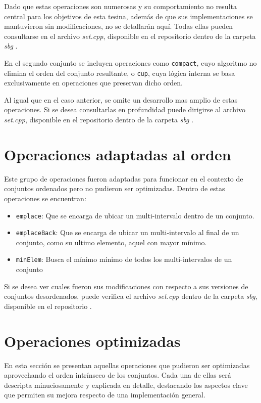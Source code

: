 Dado que estas operaciones son numerosas y su comportamiento no resulta central para los objetivos de esta tesina, además de que sus implementaciones se mantuvieron sin modificaciones, no se detallarán aquí. Todas ellas pueden consultarse en el archivo \textit{set.cpp}, disponible en el repositorio dentro de la carpeta \textit{sbg} \cite{sbg}.

En el segundo conjunto se incluyen operaciones como \texttt{compact}, cuyo algoritmo no elimina el orden del conjunto resultante, o \texttt{cup}, cuya lógica interna se basa exclusivamente en operaciones que preservan dicho orden.

Al igual que en el caso anterior, se omite un desarrollo mas amplio de estas operaciones. Si se desea consultarlas en profundidad puede dirigirse al archivo \textit{set.cpp}, disponible en el repositorio dentro de la carpeta \textit{sbg} \cite{sbg}.

\section{Operaciones adaptadas al orden}

Este grupo de operaciones fueron adaptadas para funcionar en el contexto de conjuntos ordenados pero no pudieron ser optimizadas. Dentro de estas operaciones se encuentran:

\begin{itemize}
    \item \texttt{emplace}: Que se encarga de ubicar un multi-intervalo dentro de un conjunto.
    \item \texttt{emplaceBack}: Que se encarga de ubicar un multi-intervalo al final de un conjunto, como su ultimo elemento, aquel con mayor mínimo.
    \item \texttt{minElem}: Busca el mínimo mínimo de todos los multi-intervalos de un conjunto
\end{itemize}

Si se desea ver cuales fueron sus modificaciones con respecto a sus versiones de conjuntos desordenados, puede verifica el archivo \textit{set.cpp} dentro de la carpeta \textit{sbg}, disponible en el repositorio \cite{sbg}.

\section{Operaciones optimizadas}

En esta sección se presentan aquellas operaciones que pudieron ser optimizadas aprovechando el orden intrínseco de los conjuntos. Cada una de ellas será descripta minuciosamente y explicada en detalle, destacando los aspectos clave que permiten su mejora respecto de una implementación general.

